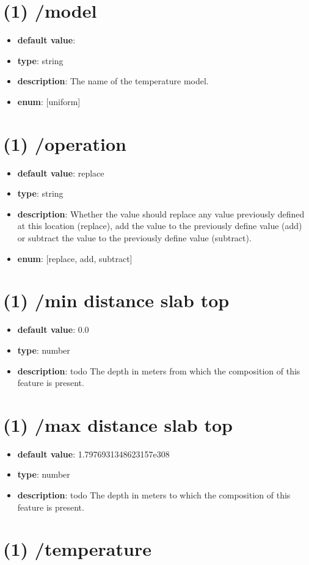 \section{(1) /model}
\begin{itemize}[leftmargin=1em]\item {\bf default value}: 
\item {\bf type}: string
\item {\bf description}: The name of the temperature model.
\item {\bf enum}: [uniform]\end{itemize}\section{(1) /operation}
\begin{itemize}[leftmargin=1em]\item {\bf default value}: replace
\item {\bf type}: string
\item {\bf description}: Whether the value should replace any value previously defined at this location (replace), add the value to the previously define value (add) or subtract the value to the previously define value (subtract).
\item {\bf enum}: [replace, add, subtract]\end{itemize}\section{(1) /min distance slab top}
\begin{itemize}[leftmargin=1em]\item {\bf default value}: 0.0
\item {\bf type}: number
\item {\bf description}: todo The depth in meters from which the composition of this feature is present.
\end{itemize}\section{(1) /max distance slab top}
\begin{itemize}[leftmargin=1em]\item {\bf default value}: 1.7976931348623157e308
\item {\bf type}: number
\item {\bf description}: todo The depth in meters to which the composition of this feature is present.
\end{itemize}\section{(1) /temperature}

